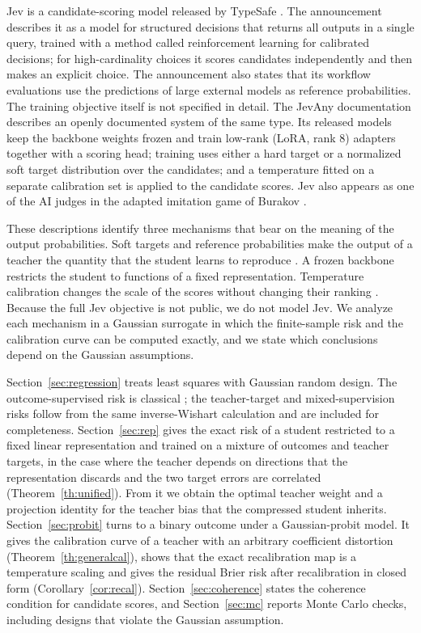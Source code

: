 \documentclass[11pt]{article}
\theoremstyle{remark}
\newcommand{\1}{\mathbf 1}
\begin{document}
Jev is a candidate-scoring model released by TypeSafe \cite{typesafe}. The announcement describes it as a model for structured decisions that returns all outputs in a single query, trained with a method called reinforcement learning for calibrated decisions; for high-cardinality choices it scores candidates independently and then makes an explicit choice. The announcement also states that its workflow evaluations use the predictions of large external models as reference probabilities. The training objective itself is not specified in detail. The JevAny documentation \cite{jevany} describes an openly documented system of the same type. Its released models keep the backbone weights frozen and train low-rank (LoRA, rank 8) adapters together with a scoring head; training uses either a hard target or a normalized soft target distribution over the candidates; and a temperature fitted on a separate calibration set is applied to the candidate scores. Jev also appears as one of the AI judges in the adapted imitation game of Burakov \cite[Chap.~1]{burakov}.

These descriptions identify three mechanisms that bear on the meaning of the output probabilities. Soft targets and reference probabilities make the output of a teacher the quantity that the student learns to reproduce \cite{hinton}. A frozen backbone restricts the student to functions of a fixed representation. Temperature calibration changes the scale of the scores without changing their ranking \cite{guo}. Because the full Jev objective is not public, we do not model Jev. We analyze each mechanism in a Gaussian surrogate in which the finite-sample risk and the calibration curve can be computed exactly, and we state which conclusions depend on the Gaussian assumptions.

Section~\ref{sec:regression} treats least squares with Gaussian random design. The outcome-supervised risk is classical \cite{breiman}; the teacher-target and mixed-supervision risks follow from the same inverse-Wishart calculation and are included for completeness. Section~\ref{sec:rep} gives the exact risk of a student restricted to a fixed linear representation and trained on a mixture of outcomes and teacher targets, in the case where the teacher depends on directions that the representation discards and the two target errors are correlated (Theorem~\ref{th:unified}). From it we obtain the optimal teacher weight and a projection identity for the teacher bias that the compressed student inherits. Section~\ref{sec:probit} turns to a binary outcome under a Gaussian-probit model. It gives the calibration curve of a teacher with an arbitrary coefficient distortion (Theorem~\ref{th:generalcal}), shows that the exact recalibration map is a temperature scaling and gives the residual Brier risk after recalibration in closed form (Corollary~\ref{cor:recal}). Section~\ref{sec:coherence} states the coherence condition for candidate scores, and Section~\ref{sec:mc} reports Monte Carlo checks, including designs that violate the Gaussian assumption.
\end{document}
